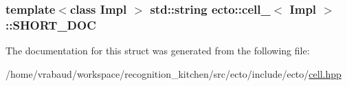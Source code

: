 \hypertarget{structecto_1_1cell___a6a5b6bd083a48acd35ffcf83dacff2f1}{
\subsubsection[{S\-H\-O\-R\-T\-\_\-\-D\-O\-C}]{\setlength{\rightskip}{0pt plus 5cm}template$<$class Impl $>$ std\-::string {\bf ecto\-::cell\-\_\-}$<$ Impl $>$\-::S\-H\-O\-R\-T\-\_\-\-D\-O\-C\hspace{0.3cm}{\ttfamily [static]}}}\label{structecto_1_1cell___a6a5b6bd083a48acd35ffcf83dacff2f1}


The documentation for this struct was generated from the following file\-:\begin{DoxyCompactItemize}
\item 
/home/vrabaud/workspace/recognition\-\_\-kitchen/src/ecto/include/ecto/\hyperlink{cell_8hpp}{cell.\-hpp}\end{DoxyCompactItemize}
